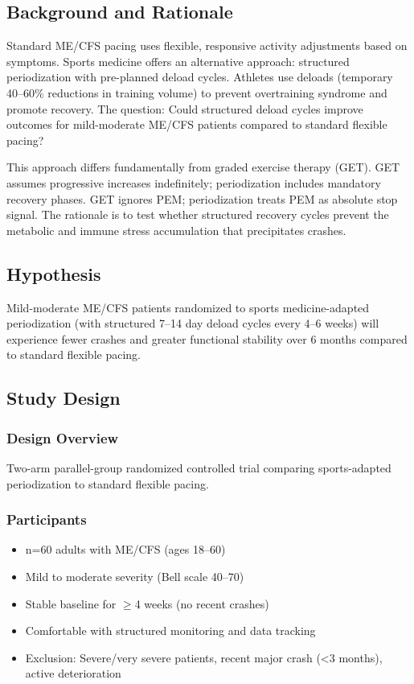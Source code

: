\subsection{Background and Rationale}

Standard ME/CFS pacing uses flexible, responsive activity adjustments based on symptoms. Sports medicine offers an alternative approach: structured periodization with pre-planned deload cycles. Athletes use deloads (temporary 40--60\% reductions in training volume) to prevent overtraining syndrome and promote recovery. The question: Could structured deload cycles improve outcomes for mild-moderate ME/CFS patients compared to standard flexible pacing?

This approach differs fundamentally from graded exercise therapy (GET). GET assumes progressive increases indefinitely; periodization includes mandatory recovery phases. GET ignores PEM; periodization treats PEM as absolute stop signal. The rationale is to test whether structured recovery cycles prevent the metabolic and immune stress accumulation that precipitates crashes.

\subsection{Hypothesis}

\begin{hypothesis}
Mild-moderate ME/CFS patients randomized to sports medicine-adapted periodization (with structured 7--14 day deload cycles every 4--6 weeks) will experience fewer crashes and greater functional stability over 6 months compared to standard flexible pacing.
\end{hypothesis}

\subsection{Study Design}

\subsubsection{Design Overview}
Two-arm parallel-group randomized controlled trial comparing sports-adapted periodization to standard flexible pacing.

\subsubsection{Participants}
\begin{itemize}
    \item n=60 adults with ME/CFS (ages 18--60)
    \item Mild to moderate severity (Bell scale 40--70)
    \item Stable baseline for $\geq$4 weeks (no recent crashes)
    \item Comfortable with structured monitoring and data tracking
    \item Exclusion: Severe/very severe patients, recent major crash (<3 months), active deterioration
\end{itemize}

